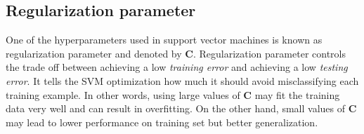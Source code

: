 \subsection{Regularization parameter} \label{subsec:RegPar}

One of the hyperparameters used in support vector machines is known as regularization parameter and denoted by $\mathbf{C}$. Regularization parameter controls the trade off between achieving a low \textit{training error} and achieving a low \textit{testing error}. It tells the SVM optimization how much it should avoid misclassifying each training example. In other words, using large values of $\mathbf{C}$ may fit the training data very well and can result in overfitting. On the other hand, small values of $\mathbf{C}$ may lead to lower performance on training set but better generalization.
